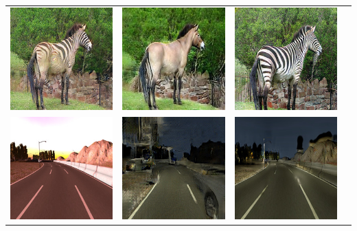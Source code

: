 \documentclass[landscape,a0paper,fontscale=0.285]{baposter} %
\begin{document}
\begin{poster}
{\begin{minipage}{1\linewidth}
\begin{tabular}{cccc}
  \includegraphics[width=.24\textwidth]{figures/horse2zebra/n02381460_2100_fake_B-1.jpg}&
  \includegraphics[width=.24\textwidth]{figures/UNIT/n02381460_2100.jpg}&
  \includegraphics[width=.24\textwidth]{figures/horse2zebra/n02381460_2100_fake_B.jpg} \\
    \includegraphics[width=.24\textwidth]{figures/dawn2night/001104_real_A.jpg}&
  \includegraphics[width=.24\textwidth]{figures/dawn2night/001104_fake_B-1.jpg}&
  \includegraphics[width=.24\textwidth]{figures/UNIT/001104.jpg}&

\end{tabular}
\end{minipage}}
\end{poster}
\end{document}
